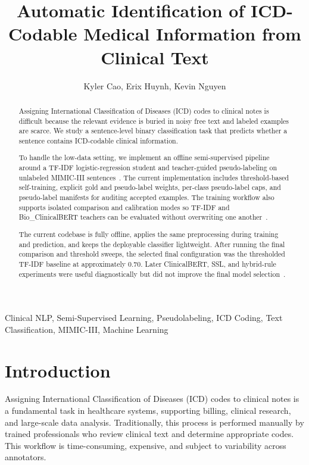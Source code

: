 \documentclass[journal]{IEEEtran}
\begin{document}
\title{Automatic Identification of ICD-Codable Medical Information from Clinical Text}

\author{Kyler Cao, Erix Huynh, Kevin Nguyen}

\maketitle

\begin{abstract}
Assigning International Classification of Diseases (ICD) codes to clinical notes is difficult because the relevant evidence is buried in noisy free text and labeled examples are scarce. We study a sentence-level binary classification task that predicts whether a sentence contains ICD-codable clinical information.

To handle the low-data setting, we implement an offline semi-supervised pipeline around a TF-IDF logistic-regression student and teacher-guided pseudo-labeling on unlabeled MIMIC-III sentences~\cite{johnson2016,lee2013}. The current implementation includes threshold-based self-training, explicit gold and pseudo-label weights, per-class pseudo-label caps, and pseudo-label manifests for auditing accepted examples. The training workflow also supports isolated comparison and calibration modes so TF-IDF and Bio\_ClinicalBERT teachers can be evaluated without overwriting one another~\cite{clinicalbert}.

The current codebase is fully offline, applies the same preprocessing during training and prediction, and keeps the deployable classifier lightweight. After running the final comparison and threshold sweeps, the selected final configuration was the thresholded TF-IDF baseline at approximately 0.70. Later ClinicalBERT, SSL, and hybrid-rule experiments were useful diagnostically but did not improve the final model selection~\cite{clinicalbert,lee2013}.
\end{abstract}

\begin{IEEEkeywords}
Clinical NLP, Semi-Supervised Learning, Pseudolabeling, ICD Coding, Text Classification, MIMIC-III, Machine Learning
\end{IEEEkeywords}

\section{Introduction}

Assigning International Classification of Diseases (ICD) codes to clinical notes is a fundamental task in healthcare systems, supporting billing, clinical research, and large-scale data analysis. Traditionally, this process is performed manually by trained professionals who review clinical text and determine appropriate codes. This workflow is time-consuming, expensive, and subject to variability across annotators.
\end{document}
